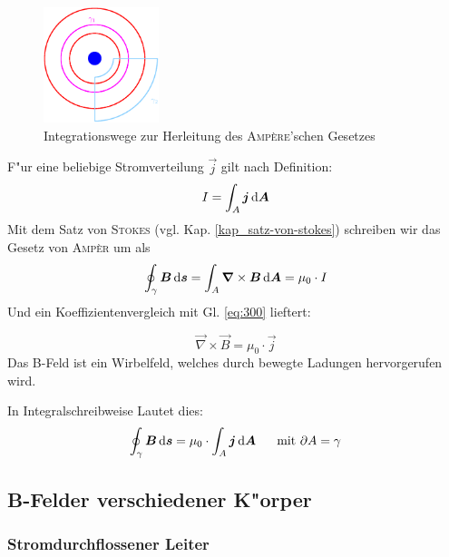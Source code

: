 \begin{figure}
   \centering
   \includegraphics[width=0.3\textwidth]{bilder/amper-gesetz_int}
   \caption{Integrationswege zur Herleitung des \textsc{Amp\`ere}'schen Gesetzes}
   \label{abb_amper_herleitung}
\end{figure}


F"ur eine beliebige Stromverteilung $\vec j$ gilt nach Definition:
\begin{equation}
\label{eq:300}
   I = \int_A \boldsymbol{j} \, \mathrm{d} \boldsymbol{A}
\end{equation}
Mit dem Satz von \textsc{Stokes} (vgl. Kap. \ref{kap_satz-von-stokes})
schreiben wir das Gesetz von \textsc{Amp\`er} um als
\begin{equation}
   \label{eqn_differenz-c99}
   \oint_\gamma \boldsymbol{B} \, \mathrm{d} \boldsymbol{s} =  \int_A \boldsymbol{\nabla} \times \boldsymbol{B} \, \mathrm{d} \boldsymbol{A} = \mu_0 \cdot I
\end{equation}
Und ein Koeffizientenvergleich mit Gl. \eqref{eq:300} lieftert:
\begin{Wichtig}
   \begin{equation}
      \label{eq:301}
\boxed{\vec \nabla \times \vec B = \mu_0 \cdot \vec j}
   \end{equation}
Das B-Feld ist ein Wirbelfeld, welches durch bewegte Ladungen
hervorgerufen wird.
\end{Wichtig}
In Integralschreibweise Lautet dies:
\begin{equation}
   \label{eq:302}
   \oint_\gamma \boldsymbol{B} \, \mathrm{d} \boldsymbol{s} = \mu_0 \cdot \int_A \boldsymbol{j} \, \mathrm{d}
   \boldsymbol{A} \text{ ~ ~ mit } \partial A = \gamma
\end{equation}





\subsection{B-Felder verschiedener K"orper}
\label{kap_b-felder-verschiedener-korper}


\subsubsection{Stromdurchflossener Leiter}
\label{kap_stromdurchflossener-leiter}


